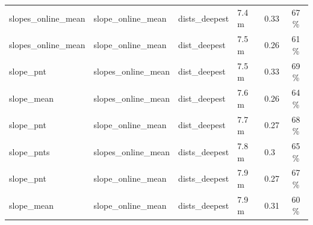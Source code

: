 \documentclass[draft,wrr]{agutexSI2019}
\begin{document}
\begin{table}
\begin{tabular}{lllllc}
            slopes\_online\_mean & slope\_online\_mean  & dists\_deepest         & 7.4 m          & 0.33          & 67 \%          \\
            slopes\_online\_mean & slope\_online\_mean  & dist\_deepest          & 7.5 m          & 0.26          & 61 \%          \\
            slope\_pnt           & slopes\_online\_mean & dist\_deepest          & 7.5 m          & 0.33          & 69 \%          \\
            slope\_mean          & slopes\_online\_mean & dist\_deepest          & 7.6 m          & 0.26          & 64 \%          \\
            slope\_pnt           & slope\_online\_mean  & dist\_deepest          & 7.7 m          & 0.27          & 68 \%          \\
            slope\_pnts          & slopes\_online\_mean & dists\_deepest         & 7.8 m          & 0.3           & 65 \%          \\
            slope\_pnt           & slope\_online\_mean  & dists\_deepest         & 7.9 m          & 0.27          & 67 \%          \\
            slope\_mean          & slope\_online\_mean  & dists\_deepest         & 7.9 m          & 0.31          & 60 \%          \\
            \hline
      \end{tabular}
\end{table}

\end{document}
